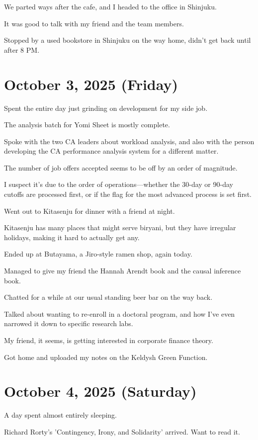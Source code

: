 \documentclass{article}
\begin{document}
We parted ways after the cafe, and I headed to the office in Shinjuku.

It was good to talk with my friend and the team members.

Stopped by a used bookstore in Shinjuku on the way home, didn't get back until after 8 PM.

\section{October 3, 2025 (Friday)}

Spent the entire day just grinding on development for my side job.

The analysis batch for Yomi Sheet is mostly complete.

Spoke with the two CA leaders about workload analysis, and also with the person developing the CA performance analysis system for a different matter.

The number of job offers accepted seems to be off by an order of magnitude.

I suspect it's due to the order of operations---whether the 30-day or 90-day cutoffs are processed first, or if the flag for the most advanced process is set first.

Went out to Kitasenju for dinner with a friend at night.

Kitasenju has many places that might serve biryani, but they have irregular holidays, making it hard to actually get any.

Ended up at Butayama, a Jiro-style ramen shop, again today.

Managed to give my friend the Hannah Arendt book and the causal inference book.

Chatted for a while at our usual standing beer bar on the way back.

Talked about wanting to re-enroll in a doctoral program, and how I've even narrowed it down to specific research labs.

My friend, it seems, is getting interested in corporate finance theory.

Got home and uploaded my notes on the Keldysh Green Function.

\section{October 4, 2025 (Saturday)}

A day spent almost entirely sleeping.

Richard Rorty's 'Contingency, Irony, and Solidarity' arrived. Want to read it.
\end{document}
